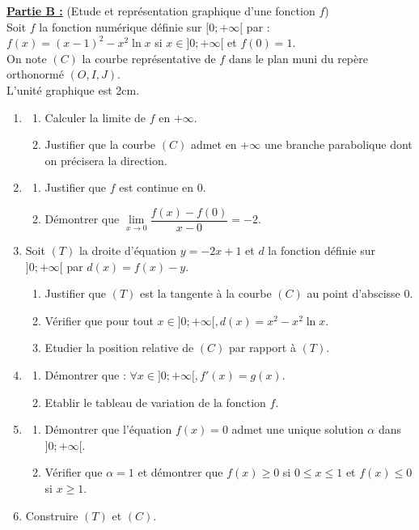 \documentclass[12pt,a4paper]{article}
\begin{document}
\noindent \underline{\textbf{Partie B :}} (Etude et représentation graphique d'une fonction $f$) \\
Soit $f$ la fonction numérique définie sur $[0; +\infty[$ par : 
$f(x) = (x - 1)^2 - x^2\ln x$ si $x \in ]0; +\infty[$ et $f(0) = 1$. \\
On note $(C)$ la courbe représentative de $f$ dans le plan muni du repère orthonormé $(O, I, J)$. \\
L'unité graphique est 2cm.
\begin{enumerate}
    \item \begin{enumerate}
        \item Calculer la limite de $f$ en $+\infty$.
        \item Justifier que la courbe $(C)$ admet en $+\infty$ une branche parabolique dont on précisera la direction.
    \end{enumerate}
    \item \begin{enumerate}
        \item Justifier que $f$ est continue en 0.
        \item Démontrer que $\lim\limits_{x \to 0} \dfrac{f(x) - f(0)}{x - 0} = -2$.
    \end{enumerate}
    \item Soit $(T)$ la droite d'équation $y = -2x + 1$ et $d$ la fonction définie sur $]0; +\infty[$ par $d(x) = f(x) - y$.
    \begin{enumerate}
        \item Justifier que $(T)$ est la tangente à la courbe $(C)$ au point d'abscisse 0.
        \item Vérifier que pour tout $x \in ]0; +\infty[, d(x) = x^2 - x^2\ln x$.
        \item Etudier la position relative de $(C)$ par rapport à $(T)$.
    \end{enumerate}
    \item \begin{enumerate}
        \item Démontrer que : $\forall x \in ]0; +\infty[, f'(x) = g(x)$.
        \item Etablir le tableau de variation de la fonction $f$.
    \end{enumerate}
    \item \begin{enumerate}
        \item Démontrer que l'équation $f(x) = 0$ admet une unique solution $\alpha$ dans $]0; +\infty[$.
        \item Vérifier que $\alpha = 1$ et démontrer que $f(x) \ge 0$ si $0 \le x \le 1$ et $f(x) \le 0$ si $x \ge 1$.
    \end{enumerate}
    \item Construire $(T)$ et $(C)$.
\end{enumerate}
\end{document}
